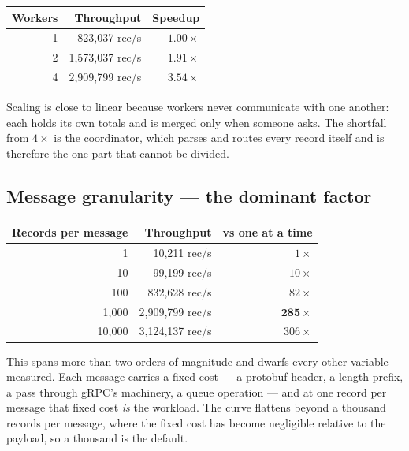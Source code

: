 \documentclass[11pt,a4paper]{article}
\begin{document}
\begin{center}\small
\begin{tabular}{@{}rrr@{}}
\toprule
\textbf{Workers} & \textbf{Throughput} & \textbf{Speedup} \\
\midrule
1 & \phantom{0,}823{,}037 rec/s & $1.00\times$ \\
2 & 1{,}573{,}037 rec/s & $1.91\times$ \\
4 & 2{,}909{,}799 rec/s & $\mathbf{3.54\times}$ \\
\bottomrule
\end{tabular}
\end{center}

Scaling is close to linear because workers never communicate with one another:
each holds its own totals and is merged only when someone asks. The shortfall
from $4\times$ is the coordinator, which parses and routes every record itself
and is therefore the one part that cannot be divided.

\subsection{Message granularity --- the dominant factor}

\begin{center}\small
\begin{tabular}{@{}rrr@{}}
\toprule
\textbf{Records per message} & \textbf{Throughput} & \textbf{vs one at a time} \\
\midrule
\phantom{00,}1 & \phantom{0,00}10{,}211 rec/s & $1\times$ \\
\phantom{0,0}10 & \phantom{0,0}99{,}199 rec/s & $10\times$ \\
\phantom{0,}100 & \phantom{0,}832{,}628 rec/s & $82\times$ \\
1{,}000 & 2{,}909{,}799 rec/s & $\mathbf{285\times}$ \\
10{,}000 & 3{,}124{,}137 rec/s & $306\times$ \\
\bottomrule
\end{tabular}
\end{center}

This spans more than two orders of magnitude and dwarfs every other variable
measured. Each message carries a fixed cost --- a protobuf header, a length
prefix, a pass through gRPC's machinery, a queue operation --- and at one record
per message that fixed cost \emph{is} the workload. The curve flattens beyond a
thousand records per message, where the fixed cost has become negligible
relative to the payload, so a thousand is the default.
\end{document}
